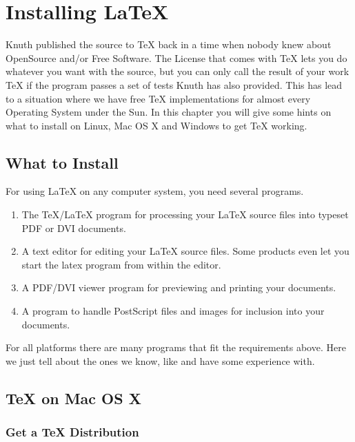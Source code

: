 \appendix
\chapter{Installing \LaTeX}
\begin{intro}
Knuth published the source to \TeX{} back in a time when nobody knew
about OpenSource and/or Free Software. The License that comes with \TeX{}
lets you do whatever you want with the source, but you can only call the
result of your work \TeX{} if the program passes a set of tests Knuth has
also provided. This has lead to a situation where we have free \TeX{}
implementations for almost every Operating System under the Sun. In this chapter
you will give some hints on what to install on Linux, Mac OS X and Windows to
get \TeX{} working.
\end{intro}

\section{What to Install}

For using LaTeX on any computer system, you need several programs.

\begin{enumerate}


\item The \TeX{}/\LaTeX{} program for processing your \LaTeX{} source files
into typeset PDF or DVI documents.

\item A text editor for editing your LaTeX source files. Some products even let
you start the latex program from within the editor.

\item A PDF/DVI viewer program for previewing and printing your
documents.

\item A program to handle PostScript files and images for inclusion into
your documents.

\end{enumerate}

For all platforms there are many programs that fit the requirements above.
Here we just tell about the ones we know, like and have some experience
with.

\section{\TeX{} on Mac OS X}

\subsection{Get a \TeX{} Distribution}

